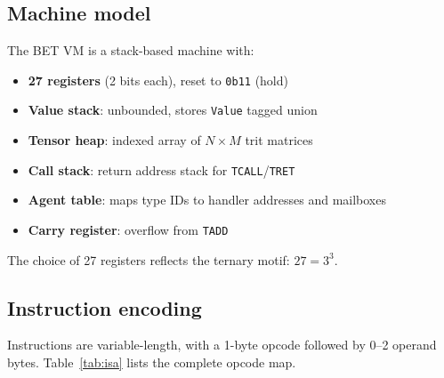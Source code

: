 \documentclass[journal,10pt,twocolumn]{IEEEtran}
\begin{document}
\subsection{Machine model}

The BET VM is a stack-based machine with:

\begin{itemize}
  \item \textbf{27 registers} (2 bits each), reset to \texttt{0b11} (hold)
  \item \textbf{Value stack}: unbounded, stores \texttt{Value} tagged union
  \item \textbf{Tensor heap}: indexed array of $N \times M$ trit matrices
  \item \textbf{Call stack}: return address stack for \texttt{TCALL}/\texttt{TRET}
  \item \textbf{Agent table}: maps type IDs to handler addresses and mailboxes
  \item \textbf{Carry register}: overflow from \texttt{TADD}
\end{itemize}

The choice of 27 registers reflects the ternary motif: $27 = 3^3$.

\subsection{Instruction encoding}

Instructions are variable-length, with a 1-byte opcode followed by 0–2
operand bytes. Table~\ref{tab:isa} lists the complete opcode map.
\end{document}
